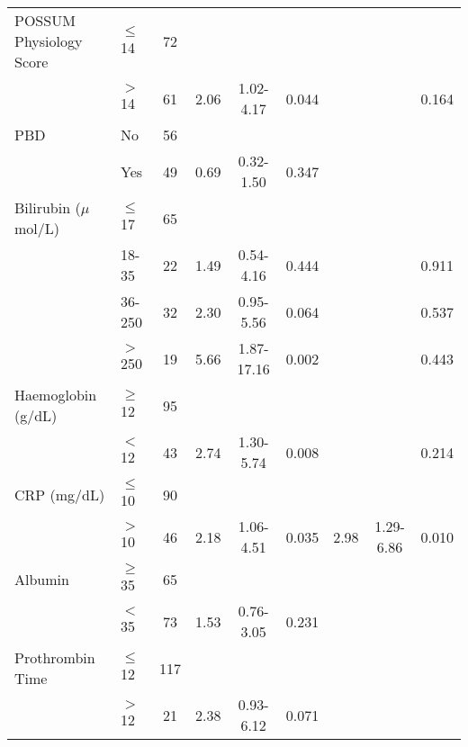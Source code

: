 \begin{sidewaystable}[htbp]
\begin{tabular}{l l c c c c c c c}
		POSSUM Physiology Score & $\leq$ 14 & 72     &      &            &         &      &            &  \\
		                        & $>$ 14    & 61     & 2.06 & 1.02-4.17  & 0.044   &      &            & 0.164   \\
		PBD                     & No        & 56     &      &            &         &      &            &  \\
		                        & Yes       & 49     & 0.69 & 0.32-1.50  & 0.347   &      &            &  \\
		Bilirubin ($\mu$mol/L)    & $\leq$ 17 & 65     &      &            &         &      &            &  \\
		                        & 18-35     & 22     & 1.49 & 0.54-4.16  & 0.444   &      &            & 0.911   \\
		                        & 36-250    & 32     & 2.30 & 0.95-5.56  & 0.064   &      &            & 0.537   \\
		                        & $>$ 250   & 19     & 5.66 & 1.87-17.16 & 0.002   &      &            & 0.443   \\
		Haemoglobin (g/dL)      & $\geq$ 12 & 95     &      &            &         &      &            &  \\
		                        & $<$ 12    & 43     & 2.74 & 1.30-5.74  & 0.008   &      &            & 0.214   \\
		CRP (mg/dL)             & $\leq$ 10 & 90     &      &            &         &      &            &  \\
		                        & $>$ 10    & 46     & 2.18 & 1.06-4.51  & 0.035   & 2.98 & 1.29-6.86  & 0.010   \\
		Albumin                 & $\geq$ 35 & 65     &      &            &         &      &            &  \\
		                        & $<$ 35    & 73     & 1.53 & 0.76-3.05  & 0.231   &      &            &  \\
		Prothrombin Time        & $\leq$ 12 & 117    &      &            &         &      &            &  \\
		                        & $>$ 12    & 21     & 2.38 & 0.93-6.12  & 0.071   &      &            &
	\end{tabular}
\end{sidewaystable}